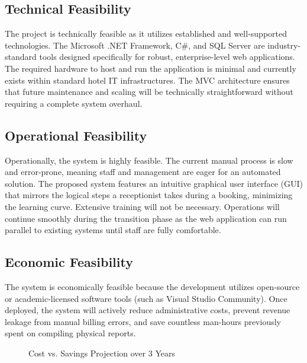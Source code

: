 \documentclass[12pt,a4paper]{article}
\begin{document}
\subsection{Technical Feasibility}
The project is technically feasible as it utilizes established and well-supported technologies. The Microsoft .NET Framework, C\#, and SQL Server are industry-standard tools designed specifically for robust, enterprise-level web applications. The required hardware to host and run the application is minimal and currently exists within standard hotel IT infrastructures. The MVC architecture ensures that future maintenance and scaling will be technically straightforward without requiring a complete system overhaul.

\subsection{Operational Feasibility}
Operationally, the system is highly feasible. The current manual process is slow and error-prone, meaning staff and management are eager for an automated solution. The proposed system features an intuitive graphical user interface (GUI) that mirrors the logical steps a receptionist takes during a booking, minimizing the learning curve. Extensive training will not be necessary. Operations will continue smoothly during the transition phase as the web application can run parallel to existing systems until staff are fully comfortable.

\subsection{Economic Feasibility}
The system is economically feasible because the development utilizes open-source or academic-licensed software tools (such as Visual Studio Community). Once deployed, the system will actively reduce administrative costs, prevent revenue leakage from manual billing errors, and save countless man-hours previously spent on compiling physical reports. 

\begin{figure}[H]
\centering
{}
\caption{Cost vs. Savings Projection over 3 Years}
\end{figure}
\end{document}
